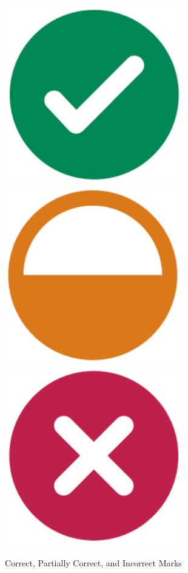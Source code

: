 \documentclass[
]{book}
\begin{document}
\begin{figure}

{\centering \includegraphics[width=3.06in]{images/scoringMarks/right-07} \includegraphics[width=3.06in]{images/scoringMarks/part-right-08} \includegraphics[width=3.06in]{images/scoringMarks/wrong-09} 

}

\caption{Correct, Partially Correct, and Incorrect Marks}\label{fig:marks}
\end{figure}
\end{document}
